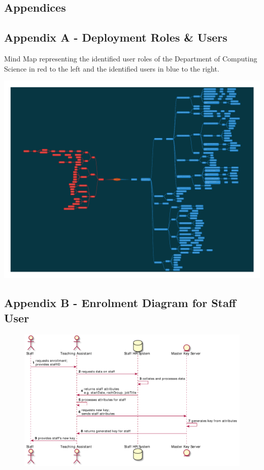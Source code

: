 \begin{appendices}

\chapter{Appendices}
\label{ch:appendices}

\section{Appendix A - Deployment Roles \& Users}
\label{appendix:roles_users}

Mind Map representing the identified user roles of the Department of Computing Science in red to the left and the identified users in blue to the right.

\includegraphics[width=\linewidth]{appendices/mind_maps/ABE_Users_slides_Oct26.pdf}

\section{Appendix B - Enrolment Diagram for Staff User}
\label{appendix:enrolment_diagram}

\begin{figure}
    \centering
    \includegraphics[width=\linewidth,keepaspectratio]{appendices/diagrams/flow_of_info/enrollment_sta_sequence.pdf}


\end{figure}
\end{appendices}
